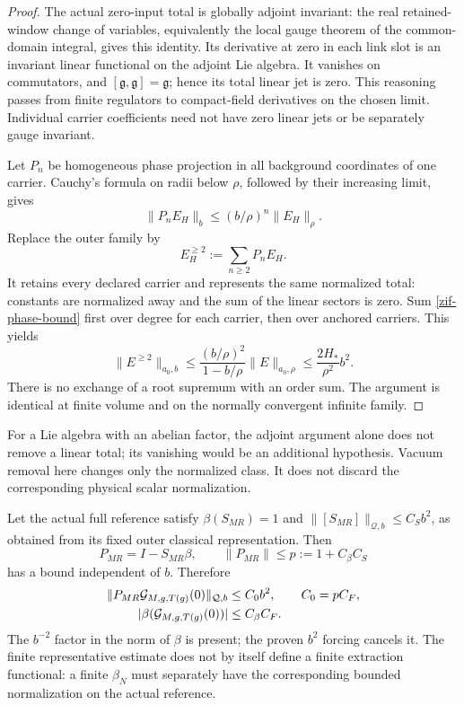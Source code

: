 \begin{proof}
The actual zero-input total is globally adjoint invariant:
the real retained-window change of variables, equivalently
the local gauge theorem of the common-domain integral, gives
this identity. Its derivative at zero in each link slot is
an invariant linear functional on the adjoint Lie algebra.
It vanishes on commutators, and
$[\mathfrak g,\mathfrak g]=\mathfrak g$; hence its total
linear jet is zero. This reasoning passes from finite
regulators to compact-field derivatives on the chosen limit.
Individual carrier coefficients need not have zero linear
jets or be separately gauge invariant.

Let $P_n$ be homogeneous phase projection in all background
coordinates of one carrier. Cauchy's formula on radii below
$\rho$, followed by their increasing limit, gives
\begin{equation}
 \|P_n E_H\|_b\le(b/\rho)^n\|E_H\|_\rho.
 \label{zif-phase-bound}
\end{equation}
Replace the outer family by
\begin{equation}
 E_H^{\ge2}:=\sum_{n\ge2}P_nE_H.
 \label{zif-representative}
\end{equation}
It retains every declared carrier and represents the same
normalized total: constants are normalized away and the
sum of the linear sectors is zero. Sum
\eqref{zif-phase-bound} first over degree for each carrier,
then over anchored carriers. This yields
\begin{equation}
 \|E^{\ge2}\|_{a_0,b}
 \le\frac{(b/\rho)^2}{1-b/\rho}\|E\|_{a_0,\rho}
 \le\frac{2H_*}{\rho^2}b^2.
 \label{zif-geometric-bound}
\end{equation}
There is no exchange of a root supremum with an order sum.
The argument is identical at finite volume and on the
normally convergent infinite family.
\end{proof}

For a Lie algebra with an abelian factor, the adjoint argument
alone does not remove a linear total; its vanishing would be
an additional hypothesis. Vacuum removal here changes only
the normalized class. It does not discard the corresponding
physical scalar normalization.

Let the actual full reference satisfy
$\beta(S_{MR})=1$ and
$\|[S_{MR}]\|_{\mathcal Q,b}\le C_Sb^2$, as obtained
from its fixed outer classical representation. Then
\begin{equation}
 P_{MR}=I-S_{MR}\beta,
 \qquad \|P_{MR}\|\le p:=1+C_\beta C_S
 \label{zif-projection}
\end{equation}
has a bound independent of $b$. Therefore
\begin{align}
 \|P_{MR}\mathcal G_{M,g,T(g)}(0)\|_{\mathcal Q,b}
      &\le C_0b^2,\qquad C_0=pC_F,\notag\\
 |\beta(\mathcal G_{M,g,T(g)}(0))|
      &\le C_\beta C_F.
 \label{zif-extracted-beta}
\end{align}
The $b^{-2}$ factor in the norm of $\beta$ is present;
the proven $b^2$ forcing cancels it. The finite representative
estimate does not by itself define a finite extraction
functional: a finite $\beta_N$ must separately have the
corresponding bounded normalization on the actual reference.

